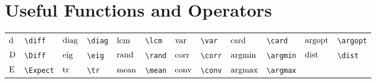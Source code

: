 \documentclass{article}
\begin{document}
\section{Useful Functions and Operators}
\begin{longtable}{*{12}{l}}
$\operatorname{d\!}$ & \lstinline`\diff` & $\operatorname{diag}$ & \lstinline`\diag` & $\operatorname{lcm}$ & \lstinline`\lcm` & $\operatorname{var}$ & \lstinline`\var` & $\operatorname{card}$ & \lstinline`\card` & $\operatorname*{argopt}$ & \lstinline`\argopt`\\
$\operatorname{D}$ & \lstinline`\Diff` & $\operatorname{eig}$ & \lstinline`\eig` & $\operatorname{rand}$ & \lstinline`\rand` & $\operatorname{corr}$ & \lstinline`\corr` & $\operatorname*{argmin}$ & \lstinline`\argmin` & $\operatorname*{dist}$ & \lstinline`\dist`\\
$\operatorname{E}$ & \lstinline`\Expect` & $\operatorname{tr}$ & \lstinline`\tr` & $\operatorname{mean}$ & \lstinline`\mean` & $\operatorname{conv}$ & \lstinline`\conv` & $\operatorname*{argmax}$ & \lstinline`\argmax` & \\
\end{longtable}
\end{document}
